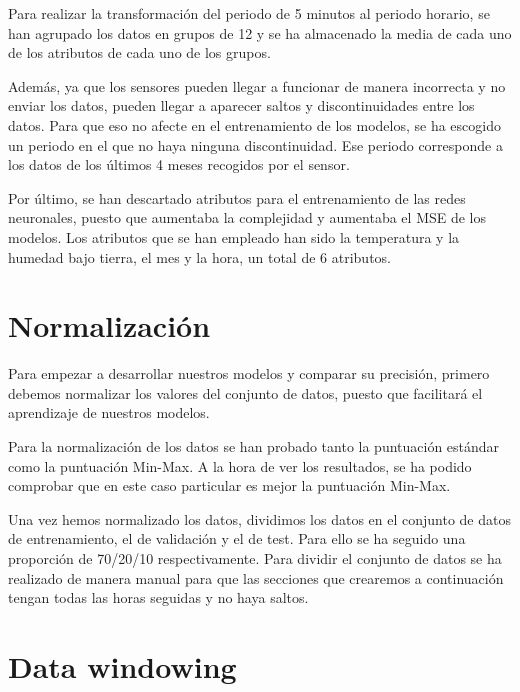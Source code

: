 Para realizar la transformación del periodo de 5 minutos al periodo horario, se han agrupado los datos en grupos de 12 y se ha almacenado la media de cada uno de los atributos de cada uno de los grupos.

\par

Además, ya que los sensores pueden llegar a funcionar de manera incorrecta y no enviar los datos, pueden llegar a aparecer saltos y discontinuidades entre los datos. Para que eso no afecte en el entrenamiento de los modelos, se ha escogido un periodo en el que no haya ninguna discontinuidad. Ese periodo corresponde a los datos de los últimos 4 meses recogidos por el sensor.

\par

Por último, se han descartado atributos para el entrenamiento de las redes neuronales, puesto que aumentaba la complejidad y aumentaba el MSE de los modelos. Los atributos que se han empleado han sido la temperatura y la humedad bajo tierra, el mes y la hora, un total de 6 atributos.

\section{Normalización}

Para empezar a desarrollar nuestros modelos y comparar su precisión, primero debemos normalizar los valores del conjunto de datos, puesto que facilitará el aprendizaje de nuestros modelos.

\par

Para la normalización de los datos se han probado tanto la puntuación estándar como la puntuación Min-Max. A la hora de ver los resultados, se ha podido comprobar que en este caso particular es mejor la puntuación Min-Max.

\par

Una vez hemos normalizado los datos, dividimos los datos en el conjunto de datos de entrenamiento, el de validación y el de test. Para ello se ha seguido una proporción de 70/20/10 respectivamente. Para dividir el conjunto de datos se ha realizado de manera manual para que las secciones que crearemos a continuación tengan todas las horas seguidas y no haya saltos.

\section{Data windowing}


